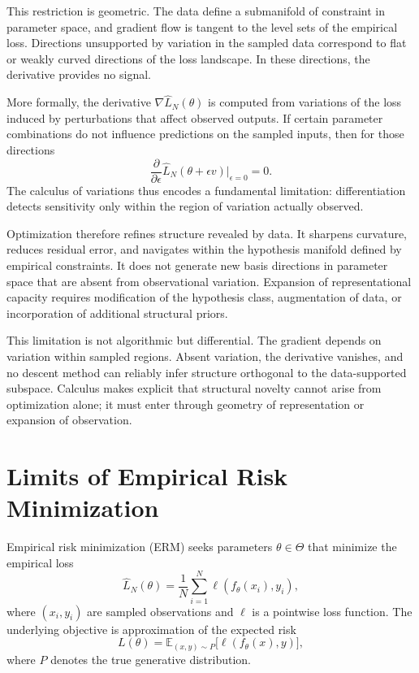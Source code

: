 \documentclass[12pt]{book}
\begin{document}
This restriction is geometric. The data define a submanifold of constraint in parameter space, and gradient flow is tangent to the level sets of the empirical loss. Directions unsupported by variation in the sampled data correspond to flat or weakly curved directions of the loss landscape. In these directions, the derivative provides no signal.

More formally, the derivative $\nabla \hat{L}_N(\theta)$ is computed from variations of the loss induced by perturbations that affect observed outputs. If certain parameter combinations do not influence predictions on the sampled inputs, then for those directions
\[
\frac{\partial}{\partial \epsilon}
\hat{L}_N(\theta + \epsilon v)
\Big|_{\epsilon = 0}
=
0.
\]
The calculus of variations thus encodes a fundamental limitation: differentiation detects sensitivity only within the region of variation actually observed.

Optimization therefore refines structure revealed by data. It sharpens curvature, reduces residual error, and navigates within the hypothesis manifold defined by empirical constraints. It does not generate new basis directions in parameter space that are absent from observational variation. Expansion of representational capacity requires modification of the hypothesis class, augmentation of data, or incorporation of additional structural priors.

This limitation is not algorithmic but differential. The gradient depends on variation within sampled regions. Absent variation, the derivative vanishes, and no descent method can reliably infer structure orthogonal to the data-supported subspace. Calculus makes explicit that structural novelty cannot arise from optimization alone; it must enter through geometry of representation or expansion of observation.

\section{Limits of Empirical Risk Minimization}

Empirical risk minimization (ERM) seeks parameters $\theta \in \Theta$ that minimize the empirical loss
\[
\hat{L}_N(\theta)
=
\frac{1}{N}
\sum_{i=1}^N
\ell(f_\theta(x_i), y_i),
\]
where $(x_i,y_i)$ are sampled observations and $\ell$ is a pointwise loss function. The underlying objective is approximation of the expected risk
\[
L(\theta)
=
\mathbb{E}_{(x,y) \sim P}
\big[ \ell(f_\theta(x), y) \big],
\]
where $P$ denotes the true generative distribution.
\end{document}
